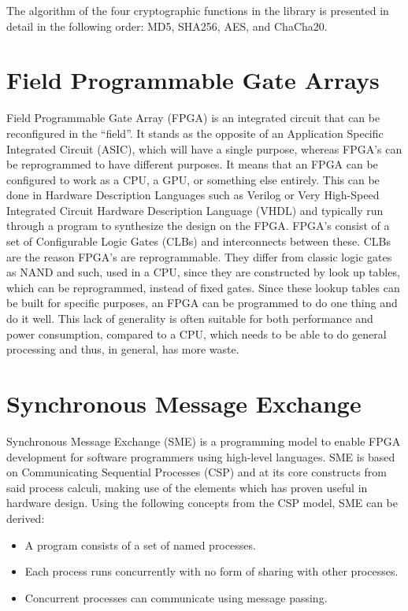 \documentclass[a4paper, openany]{memoir}
\begin{document}
\begin{abstact}
The algorithm of the four cryptographic functions in the library is presented in detail in the following order: MD5, SHA256, AES, and ChaCha20.

\section{Field Programmable Gate Arrays}
\label{sec:orgd9aa073}
Field Programmable Gate Array (FPGA) is an integrated circuit that can be reconfigured in the ``field''. It stands as the opposite of an Application Specific Integrated Circuit (ASIC), which will have a single purpose, whereas FPGA's can be reprogrammed to have different purposes. It means that an FPGA can be configured to work as a CPU, a GPU, or something else entirely. This can be done in Hardware Description Languages such as Verilog or Very High-Speed Integrated Circuit Hardware Description Language (VHDL) and typically run through a program to synthesize the design on the FPGA.
FPGA's consist of a set of Configurable Logic Gates (CLBs) and interconnects between these. CLBs are the reason FPGA's are reprogrammable. They differ from classic logic gates as NAND and such, used in a CPU, since they are constructed by look up tables, which can be reprogrammed, instead of fixed gates. Since these lookup tables can be built for specific purposes, an FPGA can be programmed to do one thing and do it well. This lack of generality is often suitable for both performance and power consumption, compared to a CPU, which needs to be able to do general processing and thus, in general, has more waste.

\section{Synchronous Message Exchange}
\label{sec:SME}
Synchronous Message Exchange (SME) is a programming model to enable FPGA development for software programmers using high-level languages. SME is based on Communicating Sequential Processes (CSP) and at its core constructs from said process calculi, making use of the elements which has proven useful in hardware design\cite{sme}. Using the following concepts from the CSP model\cite{CSP}, SME can be derived:

\begin{itemize}
\item A program consists of a set of named processes.
\item Each process runs concurrently with no form of sharing with other processes.
\item Concurrent processes can communicate using message passing.
\end{itemize}


\end{abstact}
\end{document}
